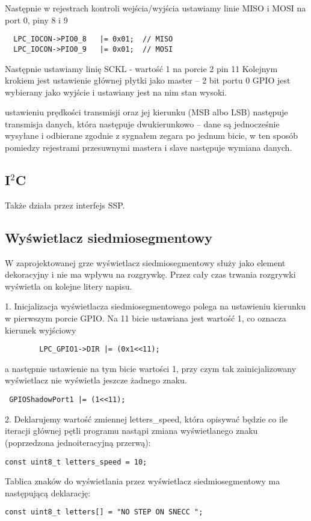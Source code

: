 \documentclass[a4paper,12pt,twoside]{article}
\theoremstyle{plain}
\theoremstyle{definition}
\theoremstyle{remark}
\begin{document}
Następnie w rejestrach kontroli wejścia/wyjścia ustawiamy linie MISO i MOSI na port 0, piny 8 i 9
\begin{verbatim}
  LPC_IOCON->PIO0_8   |= 0x01;	// MISO
  LPC_IOCON->PIO0_9   |= 0x01;	// MOSI
  \end{verbatim}
  Następnie ustawiamy linię SCKL - wartość 1 na porcie 2 pin 11
  Kolejnym krokiem jest ustawienie głównej płytki jako master -- 2 bit portu 0 GPIO jest wybierany jako wyjście i ustawiany jest na nim stan wysoki. 
  
	
	 ustawieniu prędkości transmisji oraz jej kierunku (MSB albo LSB) następuje transmisja danych, która następuje dwukierunkowo -- dane są jednocześnie wysyłane i odbierane zgodnie z sygnałem zegara po jednum bicie, w ten sposób pomiedzy rejestrami przesuwnymi mastera i slave następuje wymiana danych.



\subsection{I$^2$C}
Także działa przez interfejs SSP.

\subsection{Wyświetlacz siedmiosegmentowy}
W zaprojektowanej grze wyświetlacz siedmiosegmentowy służy jako element dekoracyjny i nie ma wpływu na rozgrywkę. Przez cały czas trwania rozgrywki wyświetla on kolejne litery napisu.

1. Inicjalizacja wyświetlacza siedmiosegmentowego polega na ustawieniu kierunku w pierwszym porcie GPIO. Na 11 bicie ustawiana jest wartość 1, co oznacza kierunek wyjściowy
\begin{verbatim}
		LPC_GPIO1->DIR |= (0x1<<11);
\end{verbatim}
a następnie ustawienie na tym bicie wartości 1, przy czym tak zainicjalizowany wyświetlacz nie wyświetla jeszcze żadnego znaku.
\begin{verbatim}
 GPIOShadowPort1 |= (1<<11);
\end{verbatim}

2. Deklarujemy wartość zmiennej letters\_speed, która opisywać będzie co ile iteracji głównej pętli programu nastąpi zmiana wyświetlanego znaku (poprzedzona jednoiteracyjną przerwą):
\begin{verbatim}
const uint8_t letters_speed = 10;
\end{verbatim}
Tablica znaków do wyświetlania przez wyświetlacz siedmiosegmentowy ma następującą deklarację:
\begin{verbatim}
const uint8_t letters[] = "NO STEP ON SNECC ";
\end{verbatim}
\end{document}
